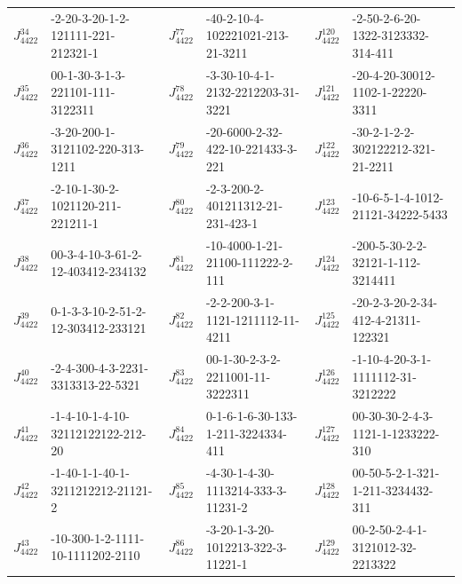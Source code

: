 \begin{table}[t]
\begin{tabular}{l l l l l l}
 $J^{34}_{4422}$&-2-20-3-20-1-2-121111-221-212321-1&\hphantom{}$J^{77}_{4422}$&-40-2-10-4-102221021-213-21-3211&\hphantom{}$J^{120}_{4422}$&-2-50-2-6-20-1322-3123332-314-411\\
 $J^{35}_{4422}$&00-1-30-3-1-3-221101-111-3122311&\hphantom{}$J^{78}_{4422}$&-3-30-10-4-1-2132-2212203-31-3221&\hphantom{}$J^{121}_{4422}$&-20-4-20-30012-1102-1-22220-3311\\
 $J^{36}_{4422}$&-3-20-200-1-3121102-220-313-1211&\hphantom{}$J^{79}_{4422}$&-20-6000-2-32-422-10-221433-3-221&\hphantom{}$J^{122}_{4422}$&-30-2-1-2-2-302122212-321-21-2211\\
 $J^{37}_{4422}$&-2-10-1-30-2-1021120-211-221211-1&\hphantom{}$J^{80}_{4422}$&-2-3-200-2-401211312-21-231-423-1&\hphantom{}$J^{123}_{4422}$&-10-6-5-1-4-1012-21121-34222-5433\\
 $J^{38}_{4422}$&00-3-4-10-3-61-2-12-403412-234132&\hphantom{}$J^{81}_{4422}$&-10-4000-1-21-21100-111222-2-111&\hphantom{}$J^{124}_{4422}$&-200-5-30-2-2-32121-1-112-3214411\\
 $J^{39}_{4422}$&0-1-3-3-10-2-51-2-12-303412-233121&\hphantom{}$J^{82}_{4422}$&-2-2-200-3-1-1121-1211112-11-4211&\hphantom{}$J^{125}_{4422}$&-20-2-3-20-2-34-412-4-21311-122321\\
 $J^{40}_{4422}$&-2-4-300-4-3-2231-3313313-22-5321&\hphantom{}$J^{83}_{4422}$&00-1-30-2-3-2-2211001-11-3222311&\hphantom{}$J^{126}_{4422}$&-1-10-4-20-3-1-1111112-31-3212222\\
 $J^{41}_{4422}$&-1-4-10-1-4-10-32112122122-212-20&\hphantom{}$J^{84}_{4422}$&0-1-6-1-6-30-133-1-211-3224334-411&\hphantom{}$J^{127}_{4422}$&00-30-30-2-4-3-1121-1-1233222-310\\
 $J^{42}_{4422}$&-1-40-1-1-40-1-3211212212-21121-2&\hphantom{}$J^{85}_{4422}$&-4-30-1-4-30-1113214-333-3-11231-2&\hphantom{}$J^{128}_{4422}$&00-50-5-2-1-321-1-211-3234432-311\\
 $J^{43}_{4422}$&-10-300-1-2-1111-10-1111202-2110&\hphantom{}$J^{86}_{4422}$&-3-20-1-3-20-1012213-322-3-11221-1&\hphantom{}$J^{129}_{4422}$&00-2-50-2-4-1-3121012-32-2213322\\


 \end{tabular}
 \label{table:newineqs}
 \end{table}

